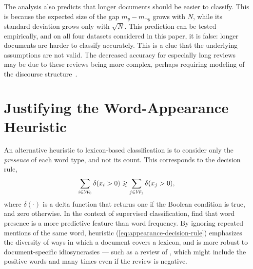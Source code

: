 The analysis also predicts that longer documents should be easier to classify. This is because the expected size of the gap $m_y - m_{\neg y}$ grows with $N$, while its standard deviation grows only with $\sqrt{N}$. This prediction can be tested empirically, and on all four datasets considered in this paper, it is false: longer documents are harder to classify accurately. This is a clue that the underlying assumptions are not valid. The decreased accuracy for especially long reviews may be due to these reviews being more complex, perhaps requiring modeling of the discourse structure~\cite{somasundaran2008discourse}.

\section{Justifying the Word-Appearance Heuristic}
An alternative heuristic to lexicon-based classification is to consider only the \emph{presence} of each word type, and not its count. This corresponds to the decision rule,
\begin{dmath}
\label{eq:appearance-decision-rule}
\sum_{i \in \lex_0} \delta(x_i > 0) \gtrless \sum_{j \in \lex_1} \delta(x_j > 0),
\end{dmath}
where $\delta(\cdot)$ is a delta function that returns one if the Boolean condition is true, and zero otherwise. In the context of supervised classification,  find that word presence is a more predictive feature than word frequency. By ignoring repeated mentions of the same word, heuristic (\ref{eq:appearance-decision-rule}) emphasizes the diversity of ways in which a document covers a lexicon, and is more robust to document-specific idiosyncrasies --- such as a review of , which might include the positive words  and  many times even if the review is negative.

